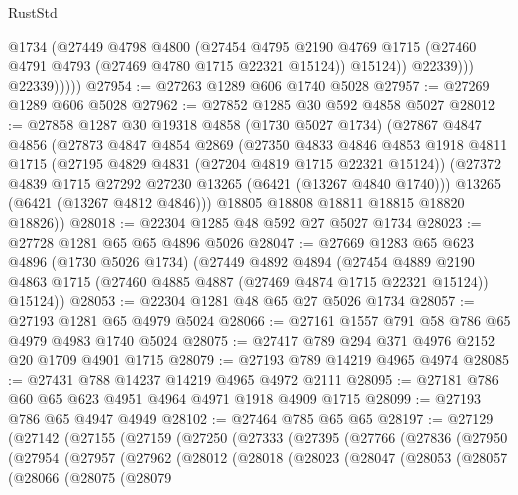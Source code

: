 \begin{lexlean}{RustStd}
\begin{coremodule}
                    @1734
                    (@27449
                      @4798
                      @4800
                      (@27454
                        @4795
                        @2190
                        @4769
                        @1715
                        (@27460 @4791 @4793 (@27469 @4780 @1715 @22321 @15124))
                        @15124))
                    @22339)))
              @22339)))))
@27954 := @27263 @1289 @606 @1740 @5028
@27957 := @27269 @1289 @606 @5028
@27962 := @27852 @1285 @30 @592 @4858 @5027
@28012 := @27858
    @1287
    @30
    @19318
    @4858
    (@1730 @5027 @1734)
    (@27867
      @4847
      @4856
      (@27873
        @4847
        @4854
        @2869
        (@27350
          @4833
          @4846
          @4853
          @1918
          @4811
          @1715
          (@27195 @4829 @4831 (@27204 @4819 @1715 @22321 @15124))
          (@27372 @4839 @1715 @27292 @27230 @13265 (@6421 (@13267 @4840 @1740)))
          @13265
          (@6421 (@13267 @4812 @4846)))
        @18805
        @18808
        @18811
        @18815
        @18820
        @18826))
@28018 := @22304 @1285 @48 @592 @27 @5027 @1734
@28023 := @27728 @1281 @65 @65 @4896 @5026
@28047 := @27669
    @1283
    @65
    @623
    @4896
    (@1730 @5026 @1734)
    (@27449
      @4892
      @4894
      (@27454
        @4889
        @2190
        @4863
        @1715
        (@27460 @4885 @4887 (@27469 @4874 @1715 @22321 @15124))
        @15124))
@28053 := @22304 @1281 @48 @65 @27 @5026 @1734
@28057 := @27193 @1281 @65 @4979 @5024
@28066 := @27161 @1557 @791 @58 @786 @65 @4979 @4983 @1740 @5024
@28075 := @27417 @789 @294 @371 @4976 @2152 @20 @1709 @4901 @1715
@28079 := @27193 @789 @14219 @4965 @4974
@28085 := @27431 @788 @14237 @14219 @4965 @4972 @2111
@28095 := @27181 @786 @60 @65 @623 @4951 @4964 @4971 @1918 @4909 @1715
@28099 := @27193 @786 @65 @4947 @4949
@28102 := @27464 @785 @65 @65
@28197 := @27129
    (@27142
      (@27155
        (@27159
          (@27250
            (@27333
              (@27395
                (@27766
                  (@27836
                    (@27950
                      (@27954
                        (@27957
                          (@27962
                            (@28012
                              (@28018
                                (@28023
                                  (@28047
                                    (@28053
                                      (@28057
                                        (@28066
                                          (@28075
                                            (@28079

\end{coremodule}
\end{lexlean}
